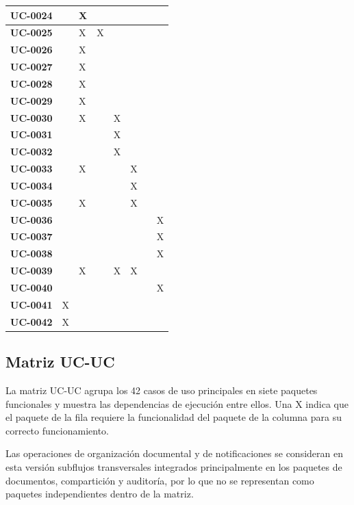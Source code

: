 \documentclass[11pt, a4paper]{article}
\begin{document}
{\begin{center}
{\begin{longtable}{|p{1.6cm}|p{1.55cm}|p{1.55cm}|p{1.55cm}|p{1.55cm}|p{1.55cm}|p{1.55cm}|p{1.55cm}|}
\hline
\textbf{UC-0024} &  & X &  &  &  &  &  \\
\hline
\textbf{UC-0025} &  & X & X &  &  &  &  \\
\hline
\textbf{UC-0026} &  & X &  &  &  &  &  \\
\hline
\textbf{UC-0027} &  & X &  &  &  &  &  \\
\hline
\textbf{UC-0028} &  & X &  &  &  &  &  \\
\hline
\textbf{UC-0029} &  & X &  &  &  &  &  \\
\hline
\textbf{UC-0030} &  & X &  & X &  &  &  \\
\hline
\textbf{UC-0031} &  &  &  & X &  &  &  \\
\hline
\textbf{UC-0032} &  &  &  & X &  &  &  \\
\hline
\textbf{UC-0033} &  & X &  &  & X &  &  \\
\hline
\textbf{UC-0034} &  &  &  &  & X &  &  \\
\hline
\textbf{UC-0035} &  & X &  &  & X &  &  \\
\hline
\textbf{UC-0036} &  &  &  &  &  &  & X \\
\hline
\textbf{UC-0037} &  &  &  &  &  &  & X \\
\hline
\textbf{UC-0038} &  &  &  &  &  &  & X \\
\hline
\textbf{UC-0039} &  & X &  & X & X &  &  \\
\hline
\textbf{UC-0040} &  &  &  &  &  &  & X \\
\hline
\textbf{UC-0041} & X &  &  &  &  &  &  \\
\hline
\textbf{UC-0042} & X &  &  &  &  &  &  \\
\hline
\end{longtable}
}
\end{center}

\subsection{Matriz UC-UC}

La matriz UC-UC agrupa los 42 casos de uso principales en siete paquetes funcionales y muestra las dependencias de ejecución entre ellos. Una X indica que el paquete de la fila requiere la funcionalidad del paquete de la columna para su correcto funcionamiento.

Las operaciones de organización documental y de notificaciones se consideran en esta versión subflujos transversales integrados principalmente en los paquetes de documentos, compartición y auditoría, por lo que no se representan como paquetes independientes dentro de la matriz.

}
\end{document}
